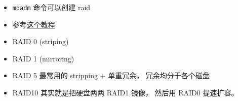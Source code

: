 
\begin{issues}
\issueDraft
\end{issues}

\begin{itemize}
\item \verb|mdadm| 命令可以创建 raid
\item 参考\href{https://www.digitalocean.com/community/tutorials/how-to-create-raid-arrays-with-mdadm-on-ubuntu-22-04}{这个教程}
\item RAID 0 (striping)
\item RAID 1 (mirroring)
\item RAID 5 最常用的 stripping + 单重冗余， 冗余均分于各个磁盘
\item RAID10 其实就是把硬盘两两 RAID1 镜像， 然后用 RAID0 提速扩容。
\end{itemize}
